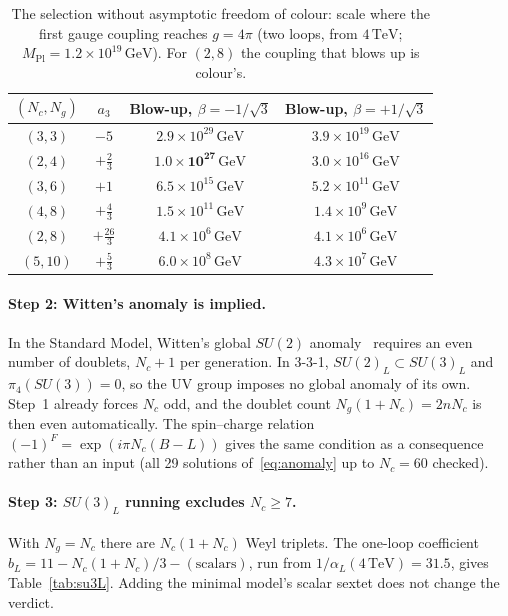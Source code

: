 \documentclass[11pt,a4paper]{article}
\newcommand{\Nc}{N_c}
\newcommand{\Ng}{N_g}
\newcommand{\MPl}{M_{\mathrm{Pl}}}
\newcommand{\GeV}{\,\mathrm{GeV}}
\newcommand{\TeV}{\,\mathrm{TeV}}
\begin{document}
\begin{table}[h]\centering
\begin{tabular}{cccc}
\toprule
$(\Nc,\Ng)$ & $a_3$ & Blow-up, $\beta=-1/\sqrt3$ & Blow-up, $\beta=+1/\sqrt3$\\
\midrule
$(3,3)$ & $-5$ & $2.9\times10^{29}\GeV$ & $3.9\times10^{19}\GeV$\\
$(2,4)$ & $+\tfrac23$ & $\mathbf{1.0\times10^{27}}\GeV$ & $3.0\times10^{16}\GeV$\\
$(3,6)$ & $+1$ & $6.5\times10^{15}\GeV$ & $5.2\times10^{11}\GeV$\\
$(4,8)$ & $+\tfrac43$ & $1.5\times10^{11}\GeV$ & $1.4\times10^{9}\GeV$\\
$(2,8)$ & $+\tfrac{26}3$ & $4.1\times10^{6}\GeV$ & $4.1\times10^{6}\GeV$\\
$(5,10)$ & $+\tfrac53$ & $6.0\times10^{8}\GeV$ & $4.3\times10^{7}\GeV$\\
\bottomrule
\end{tabular}
\caption{The selection without asymptotic freedom of colour: scale where the first gauge
coupling reaches $g=4\pi$ (two loops, from $4\TeV$; $\MPl=1.2\times10^{19}\GeV$). For
$(2,8)$ the coupling that blows up is colour's.}\label{tab:noaf}
\end{table}

\paragraph{Step 2: Witten's anomaly is implied.}
In the Standard Model, Witten's global $SU(2)$ anomaly~\cite{Witten:1982fp} requires an
even number of doublets, $\Nc+1$ per generation. In 3-3-1, $SU(2)_L\subset SU(3)_L$ and
$\pi_4(SU(3))=0$, so the UV group imposes no global anomaly of its own. Step~1 already
forces $\Nc$ odd, and the doublet count $\Ng(1+\Nc)=2n\Nc$ is then even automatically.
The spin--charge relation $(-1)^F=\exp(i\pi\Nc(B-L))$ gives the same condition as a
consequence rather than an input (all 29 solutions of~\eqref{eq:anomaly} up to $\Nc=60$
checked).

\paragraph{Step 3: $SU(3)_L$ running excludes $N_c\ge7$.}
With $\Ng=\Nc$ there are $\Nc(1+\Nc)$ Weyl triplets. The one-loop coefficient
$b_L=11-\Nc(1+\Nc)/3-(\text{scalars})$, run from $1/\alpha_L(4\TeV)=31.5$, gives
Table~\ref{tab:su3L}. Adding the minimal model's scalar sextet does not change the
verdict.
\end{document}

